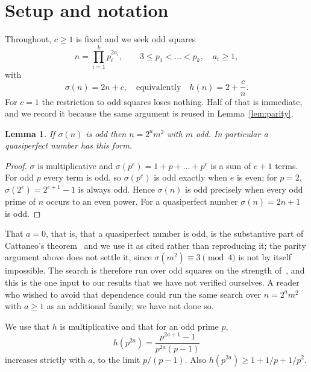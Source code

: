 \documentclass[11pt]{amsart}
\newtheorem{lemma}[theorem]{Lemma}
\theoremstyle{remark}
\begin{document}
\section{Setup and notation}

Throughout, $c \ge 1$ is fixed and we seek odd squares
\[
  n = \prod_{i=1}^{k} p_i^{2a_i}, \qquad 3 \le p_1 < \dots < p_k,\quad a_i \ge 1,
\]
with
\begin{equation}\label{eq:target}
  \sigma(n) = 2n + c, \quad\text{equivalently}\quad h(n) = 2 + \frac{c}{n}.
\end{equation}
For $c = 1$ the restriction to odd squares loses nothing. Half of that is
immediate, and we record it because the same argument is reused in
Lemma~\ref{lem:parity}.

\begin{lemma}\label{lem:oddsquare}
If $\sigma(n)$ is odd then $n = 2^{a}m^{2}$ with $m$ odd. In particular a
quasiperfect number has this form.
\end{lemma}
\begin{proof}
$\sigma$ is multiplicative and $\sigma(p^{e}) = 1 + p + \dots + p^{e}$ is a sum
of $e+1$ terms. For odd $p$ every term is odd, so $\sigma(p^{e})$ is odd exactly
when $e$ is even; for $p = 2$, $\sigma(2^{e}) = 2^{e+1}-1$ is always odd. Hence
$\sigma(n)$ is odd precisely when every odd prime of $n$ occurs to an even
power. For a quasiperfect number $\sigma(n) = 2n+1$ is odd.
\end{proof}

That $a = 0$, that is, that a quasiperfect number is odd, is the substantive part
of Cattaneo's theorem~\cite{cattaneo} and we use it as cited rather than
reproducing it; the parity argument above does not settle it, since
$\sigma(m^{2}) \equiv 3 \pmod 4$ is not by itself impossible. The search is
therefore run over odd squares on the strength of~\cite{cattaneo}, and this is
the one input to our results that we have not verified ourselves. A reader who
wished to avoid that dependence could run the same search over
$n = 2^{a}m^{2}$ with $a \ge 1$ as an additional family; we have not done so.

We use that $h$ is multiplicative and that for an odd
prime $p$,
\[
  h(p^{2a}) = \frac{p^{2a+1} - 1}{p^{2a}(p-1)}
\]
increases strictly with $a$, to the limit $p/(p-1)$. Also
$h(p^{2a}) \ge 1 + 1/p + 1/p^2$.
\end{document}
